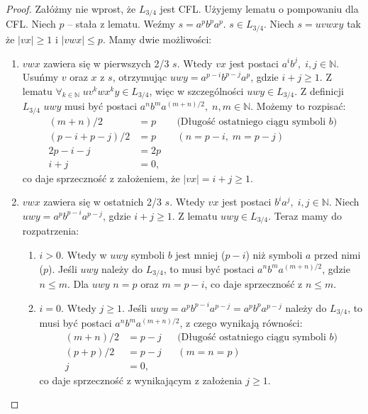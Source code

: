 \documentclass{article}
\begin{document}
\begin{proof}
    Załóżmy nie wprost, że $L_{3/4}$ jest CFL.
    Użyjemy lematu o pompowaniu dla CFL.
    Niech $p$ -- stała z lematu.
    Weźmy $s = a^p b^p a^p$. $s \in L_{3/4}$.
    Niech $s = uvwxy$ tak że $|vx| \ge 1$ i $|vwx| \le p$.
    Mamy dwie możliwości:
    \begin{enumerate}
        \item $vwx$ zawiera się w pierwszych 2/3 $s$.
        Wtedy $vx$ jest postaci $a^i b^j, \; i, j \in \mathbb{N}$.
        Usuńmy $v$ oraz $x$ z $s$, otrzymując
        $uwy = a^{p - i} b^{p - j} a^p$, gdzie $i + j \ge 1$.
        Z lematu $\forall_{k \in \mathbb{N}} \; u v^k w x^k y \in L_{3/4}$,
        więc w szczególności $uwy \in L_{3/4}$.
        Z definicji $L_{3/4}$ $uwy$ musi być postaci
        $a^n b^m a^{(m + n) / 2}, \; n, m \in \mathbb{N}$.
        Możemy to rozpisać:
        \begin{align*}
            (m + n) / 2 & = p && \text{(Długość ostatniego ciągu symboli $b$)} \\
            (p - i + p - j) / 2 & = p && (n = p - i, \; m = p - j) \\
            2p - i - j & = 2p \\
            i + j & = 0,
        \end{align*}
        co daje sprzeczność z założeniem, że $|vx| = i + j \ge 1$.
        
        \item $vwx$ zawiera się w ostatnich 2/3 $s$.
        Wtedy $vx$ jest postaci $b^i a^j, \; i, j \in \mathbb{N}$.
        Niech $uwy = a^p b^{p - i} a^{p - j}$, gdzie $i + j\ge 1$.
        Z lematu $uwy \in L_{3/4}$.
        Teraz mamy do rozpatrzenia:
        \begin{enumerate}
            \item $i > 0$.
            Wtedy w $uwy$ symboli $b$ jest mniej ($p - i$) niż symboli $a$ przed nimi ($p$).
            Jeśli $uwy$ należy do $L_{3/4}$, to musi być postaci
            $a^n b^m a^{(m + n) / 2}$, gdzie $ n \le m$.
            Dla $uwy$ $n = p$ oraz $m = p - i$, co daje sprzeczność z $n \le m$.
            \item $i = 0$. Wtedy $j \ge 1$.
            Jeśli $uwy = a^p b^{p - i} a^{p - j} = a^p b^p a^{p - j}$ należy do $L_{3/4}$,
            to musi być postaci $a^n b^m a^{(m + n) / 2}$,
            z czego wynikają równości:
            \begin{align*}
                (m + n) / 2 & = p - j && \text{(Długość ostatniego ciągu symboli $b$)} \\
                (p + p) / 2 & = p - j && (m = n = p) \\
                j & = 0,
            \end{align*}
            co daje sprzeczność z wynikającym z założenia $j \ge 1$.
        \end{enumerate}
    \end{enumerate}
\end{proof}
\end{document}
